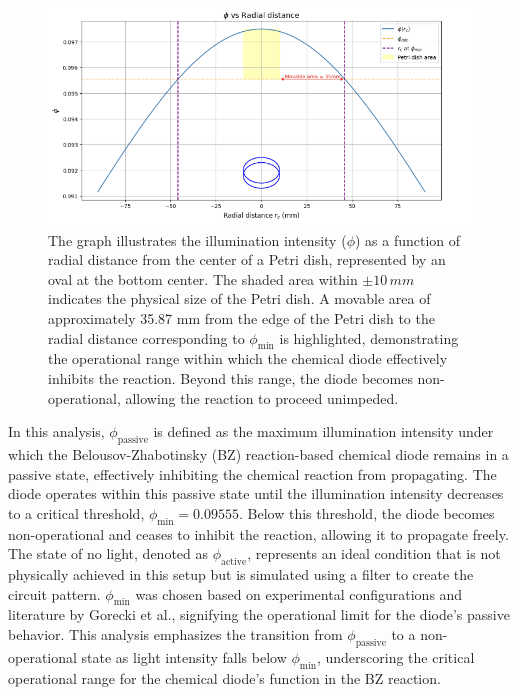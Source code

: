 \begin{figure}[h]
    \centering
    \includegraphics[width=\textwidth]{images/Screenshot 2024-03-10 at 23.57.42.png}
    \caption{The graph illustrates the illumination intensity (\( \phi \)) as a function of radial distance from the center of a Petri dish, represented by an oval at the bottom center. The shaded area within \(\pm 10\,mm\) indicates the physical size of the Petri dish. A movable area of approximately 35.87 mm from the edge of the Petri dish to the radial distance corresponding to \( \phi_{\min} \) is highlighted, demonstrating the operational range within which the chemical diode effectively inhibits the reaction. Beyond this range, the diode becomes non-operational, allowing the reaction to proceed unimpeded.}
    \label{fig:petri-dish-illumination}
\end{figure}

In this analysis, \( \phi_{\text{passive}} \) is defined as the maximum illumination intensity under which the Belousov-Zhabotinsky (BZ) reaction-based chemical diode remains in a passive state, effectively inhibiting the chemical reaction from propagating. The diode operates within this passive state until the illumination intensity decreases to a critical threshold, \( \phi_{\min} = 0.09555 \). Below this threshold, the diode becomes non-operational and ceases to inhibit the reaction, allowing it to propagate freely. The state of no light, denoted as \( \phi_{\text{active}} \), represents an ideal condition that is not physically achieved in this setup but is simulated using a filter to create the circuit pattern. \( \phi_{\min} \) was chosen based on experimental configurations and literature by Gorecki et al., signifying the operational limit for the diode's passive behavior. This analysis emphasizes the transition from \( \phi_{\text{passive}} \) to a non-operational state as light intensity falls below \( \phi_{\min} \), underscoring the critical operational range for the chemical diode's function in the BZ reaction.



